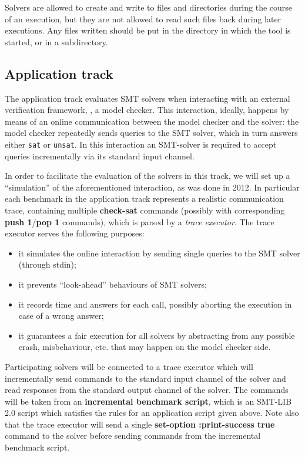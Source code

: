 \documentclass[12pt]{article}
\newcommand{\akey}[1]{\textbf{#1}}
\begin{document}
Solvers are allowed to create and write to
files and directories during the course of an execution, but they are
not allowed to read such files back during later executions.  Any
files written should be put in the directory in which the tool is
started, or in a subdirectory.

\subsection{Application track}
\label{sec:exec:application}

The application track evaluates SMT solvers when interacting
with an external verification framework, \eg, a model
checker. This interaction, ideally, happens by means of an online
communication between the model checker and the solver: the model
checker repeatedly sends queries to the SMT solver, which in turn
answers either \texttt{sat} or \texttt{unsat}.  In this interaction an SMT-solver is
required to accept queries incrementally via its standard input channel.

In order to facilitate the evaluation of the solvers in this track, we
will set up a ``simulation'' of the aforementioned interaction, as was done in 2012. In
particular each benchmark in the application track represents a realistic
communication trace, containing multiple \akey{check-sat} commands (possibly
with corresponding \akey{push 1}/\akey{pop 1} commands), which
is parsed by a {\em trace executor}. The trace executor serves the following purposes:
\begin{itemize}
\item it simulates the online interaction by sending single queries to the SMT solver
      (through stdin);
\item it prevents ``look-ahead'' behaviours of SMT solvers;
\item it records time and answers for each call, possibly aborting the execution
      in case of a wrong answer;
\item it guarantees a fair execution for all solvers by abstracting from any possible
      crash, misbehaviour, etc. that may happen on the model checker side.
\end{itemize}

Participating solvers will be connected to a trace executor 
which will incrementally send commands to the standard input channel of the solver
and read responses from the standard output channel of the solver.
The commands will be taken from an \textbf{incremental benchmark script},
which is an SMT-LIB 2.0 script which satisfies the rules for an application script given above.
Note also that the trace executor will send a single 
\akey{set-option :print-success true} command to the solver before 
sending commands from the incremental benchmark script.
\end{document}
